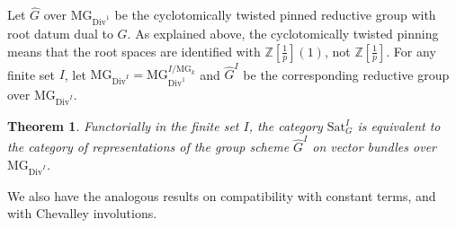 \documentclass[11pt]{amsart}
\numberwithin{equation}{section}
\newtheorem{theorem}{Theorem}
\numberwithin{theorem}{section}
\theoremstyle{definition}
\begin{document}
Let $\widehat{G}$ over $\mathrm{MG}_{\mathrm{Div}^1}$ be the cyclotomically twisted pinned reductive group with root datum dual to $G$. As explained above, the cyclotomically twisted pinning means that the root spaces are identified with $\mathbb Z[\tfrac 1p](1)$, not $\mathbb Z[\tfrac 1p]$. For any finite set $I$, let $\mathrm{MG}_{\mathrm{Div}^I} = \mathrm{MG}_{\mathrm{Div}^1}^{I/\mathrm{MG}_k}$ and $\widehat{G}^I$ be the corresponding reductive group over $\mathrm{MG}_{\mathrm{Div}^I}$.

\begin{theorem} Functorially in the finite set $I$, the category $\mathrm{Sat}_G^I$ is equivalent to the category of representations of the group scheme $\widehat{G}^I$ on vector bundles over $\mathrm{MG}_{\mathrm{Div}^I}$.
\end{theorem}

We also have the analogous results on compatibility with constant terms, and with Chevalley involutions.
\end{document}
